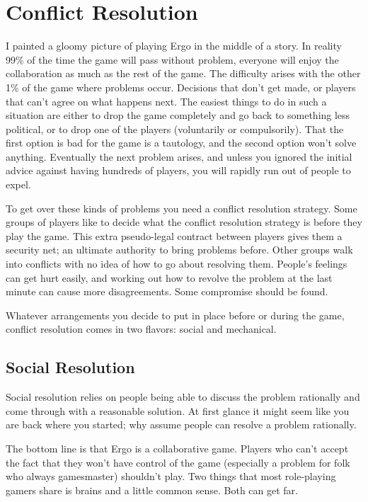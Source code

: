 \documentclass[twoside]{book}
\begin{document}
\section{Conflict Resolution}

I painted a gloomy picture of playing Ergo in the middle of a
story. In reality 99\% of the time the game will pass without problem,
everyone will enjoy the collaboration as much as the rest of the
game. The difficulty arises with the other 1\% of the game where
problems occur. Decisions that don't get made, or players that can't
agree on what happens next. The easiest things to do in such a
situation are either to drop the game completely and go back to
something less political, or to drop one of the players (voluntarily
or compulsorily). That the first option is bad for the game is a
tautology, and the second option won't solve anything. Eventually the
next problem arises, and unless you ignored the initial advice against
having hundreds of players, you will rapidly run out of people to
expel.

To get over these kinds of problems you need a conflict resolution
strategy. Some groups of players like to decide what the conflict
resolution strategy is before they play the game. This extra
pseudo-legal contract between players gives them a security net; an
ultimate authority to bring problems before. Other groups walk into
conflicts with no idea of how to go about resolving them. People's
feelings can get hurt easily, and working out how to revolve the
problem at the last minute can cause more disagreements. Some
compromise should be found.

Whatever arrangements you decide to put in place before or during the
game, conflict resolution comes in two flavors: social and
mechanical.

\subsection{Social Resolution}

Social resolution relies on people being able to discuss the problem
rationally and come through with a reasonable solution. At first
glance it might seem like you are back where you started; why assume
people can resolve a problem rationally.

The bottom line is that Ergo is a collaborative game. Players who
can't accept the fact that they won't have control of the game
(especially a problem for folk who always gamesmaster) shouldn't
play. Two things that most role-playing gamers share is brains and a
little common sense. Both can get far.
\end{document}
